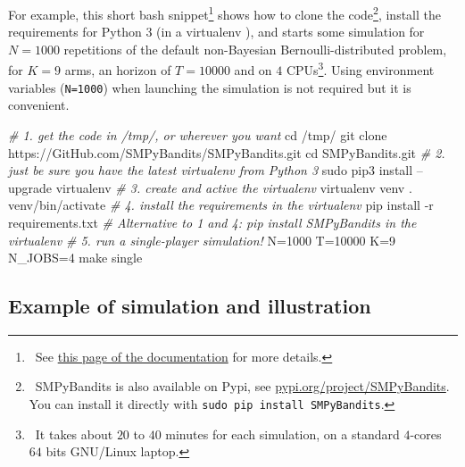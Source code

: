 \documentclass[a4paper,10pt,]{article}
\newenvironment{Shaded}{}{}
\newcommand{\BuiltInTok}[1]{#1}
\newcommand{\CommentTok}[1]{\textcolor[rgb]{0.38,0.63,0.69}{\textit{#1}}}
\newcommand{\ExtensionTok}[1]{#1}
\newcommand{\FunctionTok}[1]{\textcolor[rgb]{0.02,0.16,0.49}{#1}}
\newcommand{\NormalTok}[1]{#1}
\newcommand{\VariableTok}[1]{\textcolor[rgb]{0.10,0.09,0.49}{#1}}
\begin{document}
For example, this short bash snippet\footnote{~See
  \href{https://smpybandits.github.io/How_to_run_the_code.html}{this
  page of the documentation} for more details.} shows how to clone the
code\footnote{~SMPyBandits is also available on Pypi, see
  \href{https://pypi.org/project/SMPyBandits/}{pypi.org/project/SMPyBandits}.
  You can install it directly with
  \texttt{sudo\ pip\ install\ SMPyBandits}.}, install the requirements
for Python 3 (in a virtualenv \citep{virtualenv}), and starts some
simulation for \(N=1000\) repetitions of the default non-Bayesian
Bernoulli-distributed problem, for \(K=9\) arms, an horizon of
\(T=10000\) and on \(4\) CPUs\footnote{~It takes about \(20\) to
  \(40\) minutes for each simulation, on a standard \(4\)-cores \(64\)
  bits GNU/Linux laptop.}. Using environment variables (\texttt{N=1000})
when launching the simulation is not required but it is convenient.

\begin{Shaded}
\begin{Highlighting}[]
\CommentTok{# 1. get the code in /tmp/, or wherever you want}
\BuiltInTok{cd}\NormalTok{ /tmp/}
\FunctionTok{git}\NormalTok{ clone https://GitHub.com/SMPyBandits/SMPyBandits.git}
\BuiltInTok{cd}\NormalTok{ SMPyBandits.git}
\CommentTok{# 2. just be sure you have the latest virtualenv from Python 3}
\FunctionTok{sudo}\NormalTok{ pip3 install --upgrade virtualenv}
\CommentTok{# 3. create and active the virtualenv}
\ExtensionTok{virtualenv}\NormalTok{ venv}
\BuiltInTok{.} \ExtensionTok{venv/bin/activate}
\CommentTok{# 4. install the requirements in the virtualenv}
\ExtensionTok{pip}\NormalTok{ install -r requirements.txt}
\CommentTok{# Alternative to 1 and 4: pip install SMPyBandits in the virtualenv}
\CommentTok{# 5. run a single-player simulation!}
\VariableTok{N=}\NormalTok{1000 }\VariableTok{T=}\NormalTok{10000 }\VariableTok{K=}\NormalTok{9 }\VariableTok{N_JOBS=}\NormalTok{4 }\FunctionTok{make}\NormalTok{ single}
\end{Highlighting}
\end{Shaded}

\subsection{Example of simulation and
illustration}\label{example-of-simulation-and-illustration}
\end{document}
